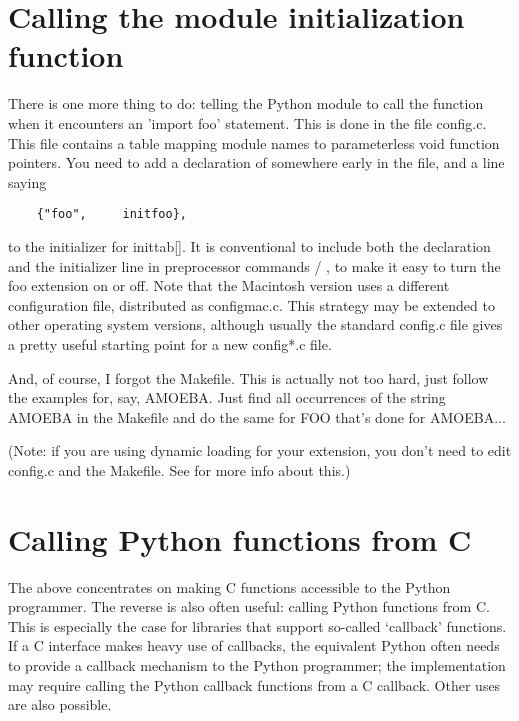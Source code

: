 \section{Calling the module initialization function}

There is one more thing to do: telling the Python module to call the
 function when it encounters an 'import foo' statement.
This is done in the file config.c.  This file contains a table mapping
module names to parameterless void function pointers.  You need to add
a declaration of  somewhere early in the file, and a
line saying

\begin{verbatim}
    {"foo",     initfoo},
\end{verbatim}

to the initializer for inittab[].  It is conventional to include both
the declaration and the initializer line in preprocessor commands
 / , to make it easy to turn the
foo extension on or off.  Note that the Macintosh version uses a
different configuration file, distributed as configmac.c.  This
strategy may be extended to other operating system versions, although
usually the standard config.c file gives a pretty useful starting
point for a new config*.c file.

And, of course, I forgot the Makefile.  This is actually not too hard,
just follow the examples for, say, AMOEBA.  Just find all occurrences
of the string AMOEBA in the Makefile and do the same for FOO that's
done for AMOEBA...

(Note: if you are using dynamic loading for your extension, you don't
need to edit config.c and the Makefile.  See  for more
info about this.)


\section{Calling Python functions from C}

The above concentrates on making C functions accessible to the Python
programmer.  The reverse is also often useful: calling Python
functions from C.  This is especially the case for libraries that
support so-called `callback' functions.  If a C interface makes heavy
use of callbacks, the equivalent Python often needs to provide a
callback mechanism to the Python programmer; the implementation may
require calling the Python callback functions from a C callback.
Other uses are also possible.

